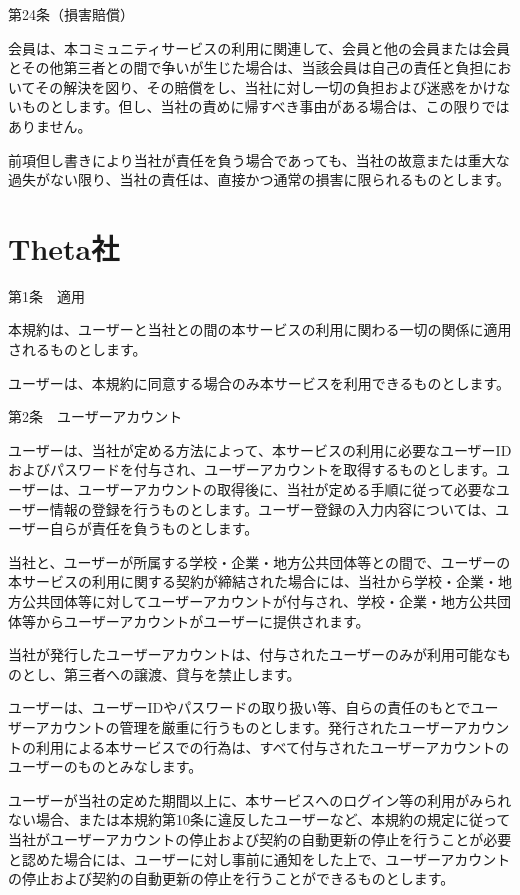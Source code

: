 第24条（損害賠償）

    会員は、本コミュニティサービスの利用に関連して、会員と他の会員または会員とその他第三者との間で争いが生じた場合は、当該会員は自己の責任と負担においてその解決を図り、その賠償をし、当社に対し一切の負担および迷惑をかけないものとします。但し、当社の責めに帰すべき事由がある場合は、この限りではありません。

    前項但し書きにより当社が責任を負う場合であっても、当社の故意または重大な過失がない限り、当社の責任は、直接かつ通常の損害に限られるものとします。

\section{Theta社}
第1条　適用

    本規約は、ユーザーと当社との間の本サービスの利用に関わる一切の関係に適用されるものとします。

    ユーザーは、本規約に同意する場合のみ本サービスを利用できるものとします。

第2条　ユーザーアカウント

    ユーザーは、当社が定める方法によって、本サービスの利用に必要なユーザーIDおよびパスワードを付与され、ユーザーアカウントを取得するものとします。ユーザーは、ユーザーアカウントの取得後に、当社が定める手順に従って必要なユーザー情報の登録を行うものとします。ユーザー登録の入力内容については、ユーザー自らが責任を負うものとします。

    当社と、ユーザーが所属する学校・企業・地方公共団体等との間で、ユーザーの本サービスの利用に関する契約が締結された場合には、当社から学校・企業・地方公共団体等に対してユーザーアカウントが付与され、学校・企業・地方公共団体等からユーザーアカウントがユーザーに提供されます。

    当社が発行したユーザーアカウントは、付与されたユーザーのみが利用可能なものとし、第三者への譲渡、貸与を禁止します。

    ユーザーは、ユーザーIDやパスワードの取り扱い等、自らの責任のもとでユーザーアカウントの管理を厳重に行うものとします。発行されたユーザーアカウントの利用による本サービスでの行為は、すべて付与されたユーザーアカウントのユーザーのものとみなします。

    ユーザーが当社の定めた期間以上に、本サービスへのログイン等の利用がみられない場合、または本規約第10条に違反したユーザーなど、本規約の規定に従って当社がユーザーアカウントの停止および契約の自動更新の停止を行うことが必要と認めた場合には、ユーザーに対し事前に通知をした上で、ユーザーアカウントの停止および契約の自動更新の停止を行うことができるものとします。

